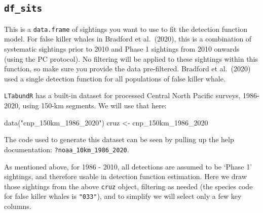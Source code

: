 \documentclass[
]{book}
\newenvironment{Shaded}{\begin{snugshade}}{\end{snugshade}}
\newcommand{\FunctionTok}[1]{\textcolor[rgb]{0.00,0.00,0.00}{#1}}
\newcommand{\NormalTok}[1]{#1}
\newcommand{\OtherTok}[1]{\textcolor[rgb]{0.56,0.35,0.01}{#1}}
\newcommand{\StringTok}[1]{\textcolor[rgb]{0.31,0.60,0.02}{#1}}
\begin{document}
\hypertarget{df_sits}{%
\subsection*{\texorpdfstring{\texttt{df\_sits}}{df\_sits}}\label{df_sits}}

This is a \texttt{data.frame} of sightings you want to use to fit the detection function model. For false killer whales in Bradford et al.~(2020), this is a combination of systematic sightings prior to 2010 and Phase 1 sightings from 2010 onwards (using the PC protocol). No filtering will be applied to these sightings within this function, so make sure you provide the data pre-filtered. Bradford et al.~(2020) used a single detection function for all populations of false killer whale.

\texttt{LTabundR} has a built-in dataset for processed Central North Pacific surveys, 1986-2020, using 150-km segments. We will use that here:

\begin{Shaded}
\begin{Highlighting}[]
\FunctionTok{data}\NormalTok{(}\StringTok{"cnp\_150km\_1986\_2020"}\NormalTok{)}
\NormalTok{cruz }\OtherTok{\textless{}{-}}\NormalTok{ cnp\_150km\_1986\_2020}
\end{Highlighting}
\end{Shaded}

The code used to generate this dataset can be seen by pulling up the help documentation: \texttt{?noaa\_10km\_1986\_2020}.

As mentioned above, for 1986 - 2010, all detections are assumed to be `Phase 1' sightings, and therefore usable in detection function estimation. Here we draw those sightings from the above \texttt{cruz} object, filtering as needed (the species code for false killer whales is \texttt{"033"}), and to simplify we will select only a few key columns.
\end{document}
